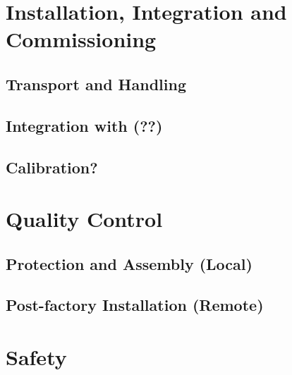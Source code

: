 \section{Installation, Integration and Commissioning}
\label{sec:fddp-slow-cryo-install}

\subsection{Transport and Handling}
\label{sec:fddp-slow-cryo-install-transport}


\subsection{Integration with (??)}
\label{sec:fddp-slow-cryo-install-?}


\subsection{Calibration?}
\label{sec:fddp-slow-cryo-install-calib}



\section{Quality Control}
\label{sec:fddp-slow-cryo-qc}

\subsection{Protection and Assembly (Local)}
\label{sec:fddp-slow-cryo-qc-local}


\subsection{Post-factory Installation (Remote)}
\label{sec:fddp-slow-cryo-qc-remote}





\section{Safety}
\label{sec:fddp-slow-cryo-safety}

